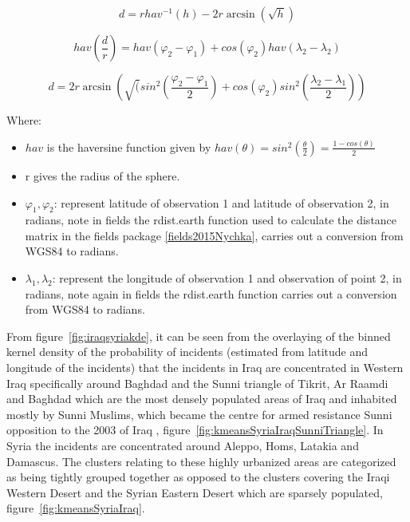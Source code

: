\begin{equation} d = r hav^{-1}(h) - 2r\arcsin(\sqrt{h})  \label{eq:haversine1}  \end{equation}

\begin{equation} hav(\frac{d}{r}) =hav(\varphi_{2}-\varphi_{1})+cos(\varphi_{2})hav(\lambda_{2}-\lambda_{2})  \label{eq:haversine2}  \end{equation}

\begin{equation} d=2r \arcsin(\sqrt(sin^{2}(\frac{\varphi_2-\varphi_1}{2})+cos(\varphi_2)sin^{2}(\frac{\lambda_2-\lambda_1}{2}))  \label{eq:haversine3}  \end{equation}

Where:
\begin{itemize}
\item[]  $hav$ is the haversine function given by $hav(\theta)=sin^2(\frac{\theta}{2})=\frac{1-cos(\theta)}{2}$
\item[] r gives the radius of the sphere.
\item[] $\varphi_1, \varphi_2$: represent latitude of observation 1 and latitude of observation 2, in radians, note in fields the rdist.earth function used to calculate the distance matrix in the fields package \ref{fields2015Nychka}, carries out a conversion from WGS84 \citep{misra1996integrated} to radians.
\item[]  $\lambda_1,\lambda_2$: represent the longitude of observation 1 and observation of point 2, in radians, note again in fields the rdist.earth function carries out a conversion from WGS84 \citep{misra1996integrated} to radians.
\end{itemize}

From figure~\ref{fig:iraqsyriakde}, it can be seen from the overlaying of the binned kernel density of the probability of incidents (estimated from latitude and longitude of the incidents) that the incidents in Iraq are concentrated in Western Iraq specifically around Baghdad and the Sunni triangle \citep{rand2015iraq} of Tikrit, Ar Raamdi and Baghdad which are the most densely populated areas of Iraq and inhabited mostly by Sunni Muslims, which became the centre for armed resistance Sunni opposition to the 2003 of Iraq \citep{hashim2005insurgency}, figure~\ref{fig:kmeansSyriaIraqSunniTriangle}. In Syria the incidents are concentrated around Aleppo, Homs, Latakia and Damascus. The clusters relating to these highly urbanized areas are categorized as being tightly grouped together as opposed to the clusters covering the Iraqi Western Desert and the Syrian Eastern Desert which are sparsely populated, figure~\ref{fig:kmeansSyriaIraq}.

